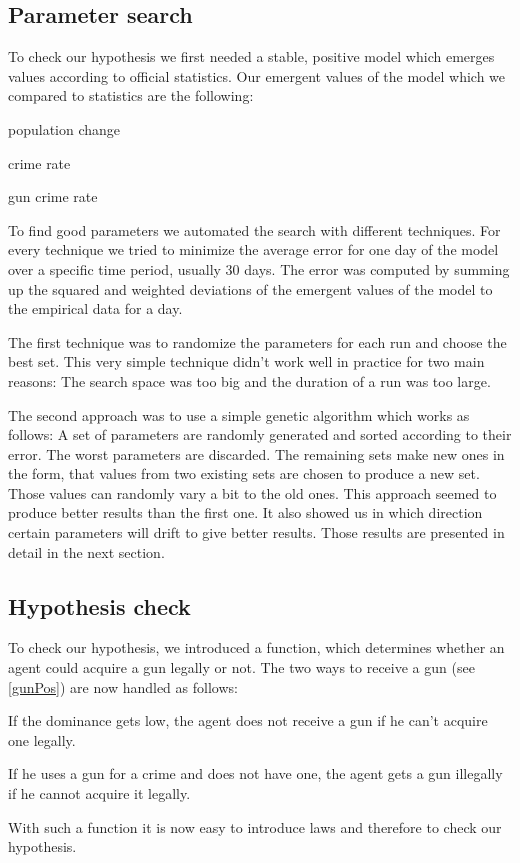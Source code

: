 \documentclass{JASSS}
\begin{document}
    \subsection{Parameter search}

    To check our hypothesis we first needed a stable, positive model which emerges values according to official statistics.
    Our emergent values of the model which we compared to statistics are the following:
    \begin{itemize*}
        \item population change
        \item crime rate
        \item gun crime rate
    \end{itemize*}
    To find good parameters we automated the search with different techniques.
    For every technique we tried to minimize the average error for one day of the model over a specific time period, usually 30 days.
    The error was computed by summing up the squared and weighted deviations of the emergent values of the model to the empirical data for a day.

    The first technique was to randomize the parameters for each run and choose the best set. This very simple technique didn't work well in practice for two main reasons:
    The search space was too big and the duration of a run was too large.

    The second approach was to use a simple genetic algorithm which works as follows:
    A set of parameters are randomly generated and sorted according to their error.
    The worst parameters are discarded. The remaining sets make new ones in the form, that values from two existing sets are chosen to produce a new set. Those values can randomly vary a bit to the old ones.
    This approach seemed to produce better results than the first one. It also showed us in which direction certain parameters will drift to give better results. Those results are presented in detail in the next section.

    \subsection{Hypothesis check}

    To check our hypothesis, we introduced a function, which determines whether an agent could acquire a gun legally or not.
    The two ways to receive a gun (see \ref{gunPos}) are now handled as follows:
    \begin{itemize*}
        \item If the dominance gets low, the agent does not receive a gun if he can't acquire one legally.
        \item If he uses a gun for a crime and does not have one, the agent gets a gun illegally if he cannot acquire it legally.
    \end{itemize*}
    With such a function it is now easy to introduce laws and therefore to check our hypothesis. \label{hyp}
\end{document}
